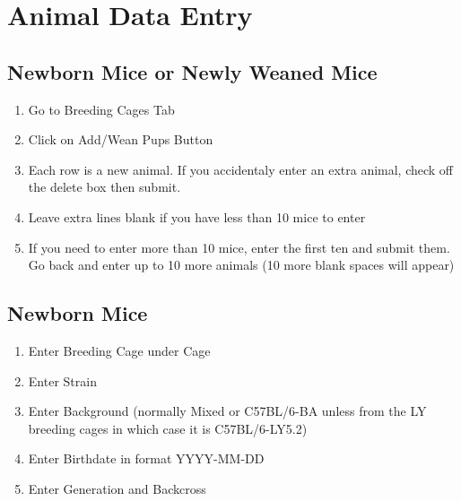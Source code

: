 \documentclass[letterpaper,10pt,english]{sphinxmanual}
\begin{document}
\chapter{Animal Data Entry}
\label{usage:animal-data-entry}\label{usage::doc}

\section{Newborn Mice or Newly Weaned Mice}
\label{usage:newborn-mice-or-newly-weaned-mice}\begin{enumerate}
\item {} 
Go to Breeding Cages Tab

\item {} 
Click on Add/Wean Pups Button

\item {} 
Each row is a new animal.  If you accidentaly enter an extra animal, check off the delete box then submit.

\item {} 
Leave extra lines blank if you have less than 10 mice to enter

\item {} 
If you need to enter more than 10 mice, enter the first ten and submit them.  Go back and enter up to 10 more animals (10 more blank spaces will appear)

\end{enumerate}


\section{Newborn Mice}
\label{usage:newborn-mice}\begin{enumerate}
\item {} 
Enter Breeding Cage under Cage

\item {} 
Enter Strain

\item {} 
Enter Background (normally Mixed or C57BL/6-BA unless from the LY breeding cages in which case it is C57BL/6-LY5.2)

\item {} 
Enter Birthdate in format YYYY-MM-DD

\item {} 
Enter Generation and Backcross

\end{enumerate}
\end{document}

